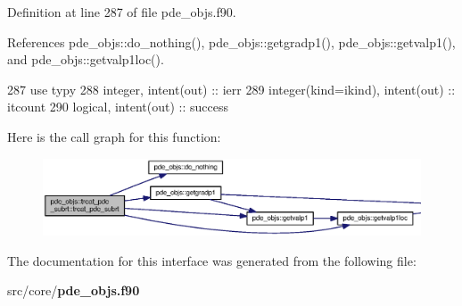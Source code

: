 Definition at line 287 of file pde\+\_\+objs.\+f90.



References pde\+\_\+objs\+::do\+\_\+nothing(), pde\+\_\+objs\+::getgradp1(), pde\+\_\+objs\+::getvalp1(), and pde\+\_\+objs\+::getvalp1loc().


\begin{DoxyCode}
287       \textcolor{keywordtype}{use }typy
288       \textcolor{keywordtype}{integer}, \textcolor{keywordtype}{intent(out)} :: ierr
289       \textcolor{keywordtype}{integer(kind=ikind)}, \textcolor{keywordtype}{intent(out)} :: itcount
290       \textcolor{keywordtype}{logical}, \textcolor{keywordtype}{intent(out)} :: success
\end{DoxyCode}


Here is the call graph for this function\+:\nopagebreak
\begin{figure}[H]
\begin{center}
\leavevmode
\includegraphics[width=350pt]{interfacepde__objs_1_1treat__pde__subrt_a9f5b27926620eb08071cf3c1c49c199b_cgraph}
\end{center}
\end{figure}




The documentation for this interface was generated from the following file\+:\begin{DoxyCompactItemize}
\item 
src/core/{\bf pde\+\_\+objs.\+f90}\end{DoxyCompactItemize}
